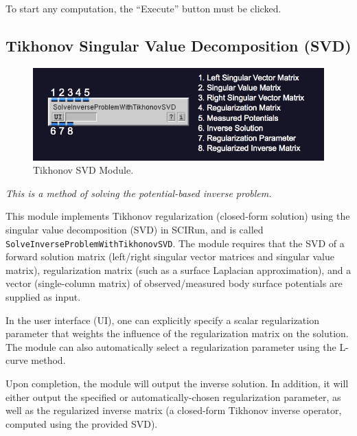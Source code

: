 To start any computation, the ``Execute'' button must be clicked.

\subsection{Tikhonov Singular Value Decomposition (SVD)}

\begin{figure}[H]
\begin{center}
\includegraphics[width=\textwidth]{ECGToolkitGuide_figures/SolveInverseProblemWithTikhonovSVD.png}
\caption{Tikhonov SVD Module.}
\label{tikhonovsvd}
\end{center}
\end{figure}

\vspace{5pt}\textit{This is a method of solving the potential-based inverse problem.}\vspace{5pt}

This module implements Tikhonov regularization (closed-form solution) using the singular value decomposition (SVD) in SCIRun, and is called
\\{\tt SolveInverseProblemWithTikhonovSVD}. The module requires that the SVD of a forward solution matrix (left/right singular vector matrices and singular value matrix), regularization matrix (such as a surface Laplacian approximation), and a vector (single-column matrix) of observed/measured body surface potentials are supplied as input.

In the user interface (UI), one can explicitly specify a scalar regularization parameter that weights the influence of the regularization matrix on the solution. The module can also automatically select a regularization parameter using the L-curve method.

Upon completion, the module will output the inverse solution. In addition, it will either output the specified or automatically-chosen regularization parameter, as well as the regularized inverse matrix (a closed-form Tikhonov inverse operator, computed using the provided SVD).

